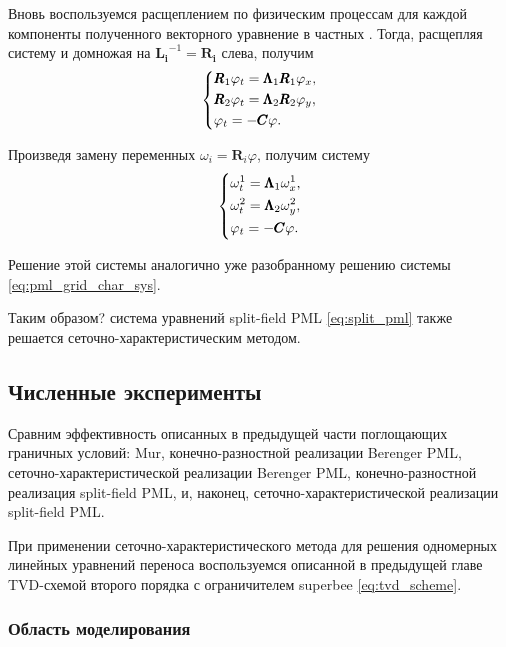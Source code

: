 Вновь воспользуемся расщеплением по физическим процессам для каждой компоненты полученного векторного уравнение в частных \cite{rashep_marchuk}. Тогда, расщепляя систему и домножая на $\pmb{L_i}^{-1}=\pmb{R_i}$ слева, получим
\begin{equation*}
    \begin{dcases}
        \pmb{R}_1\varphi_t = \pmb{\Lambda}_1\pmb{R}_1 \varphi_x , \\
        \pmb{R}_2\varphi_t = \pmb{\Lambda}_2\pmb{R}_2 \varphi_y , \\
        \varphi_t = - \pmb{C} \varphi  .
    \end{dcases}
\end{equation*}

\noindent Произведя замену переменных $\omega_i = \pmb{R}_i \varphi$, получим систему
\begin{equation*}
    \begin{dcases}
        \omega_t^1 = \pmb{\Lambda}_1\omega_x^1 , \\
        \omega_t^2 = \pmb{\Lambda}_2\omega_y^2 , \\
        \varphi_t = - \pmb{C} \varphi  .
    \end{dcases}
\end{equation*}

\noindent Решение этой системы аналогично уже разобранному решению системы \eqref{eq:pml_grid_char_sys}. 

Таким образом? система уравнений split-field PML \eqref{eq:split_pml} также решается сеточно-харак\-теристическим методом.

\subsection{Численные эксперименты}

Сравним эффективность описанных в предыдущей части поглощающих граничных условий: Mur, конечно-разностной реализации Berenger PML, сеточно-характеристичес\-кой реализации Berenger PML, конечно-разностной реализация split-field PML, и, наконец, сеточно-характеристической реализации split-field PML.

При применении сеточно-характеристического метода для решения одномерных линейных уравнений переноса воспользуемся описанной в предыдущей главе TVD-схемой второго порядка с ограничителем superbee \eqref{eq:tvd_scheme}.

\subsubsection{Область моделирования}

